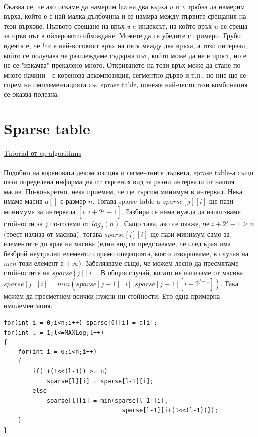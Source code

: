 \documentclass[12pt]{article}
\begin{document}
\paragraph*{}
Оказва се, че ако искаме да намерим lca на два върха $u$ и $v$ трябва да намерим върха, който е с най-малка дълбочина и се намира между първите срещания на тези върхове. Първото срещане на връх $u$  e индексът, на който връх $u$ се среща за пръв път в ойлеровото обхождане. Можете да се убедите с примери. Грубо идеята е, че $lca$ е най-високият връх на пътя между два връха, а този интервал, който се получава че разглеждаме съдържа път, който може да не е прост, но е не се "изкачва"  прекалено много. Откриването на този връх може да стане по много начини - с коренова декомпозиция, сегментно дърво и т.н., но ние ще се спрем на имплементацията със sprase table, понеже най-често тази комбинация се оказва полезна.

\section*{Sparse table}
\paragraph*{}
\href{https://cp-algorithms.com/data_structures/sparse-table.html}{Tutorial от cp-algorithms}
\paragraph*{}
Подобно на кореновата декомпозиция и сегментните дървета, sprase table-а също пази определена информация от търсения вид за разни интервали от нашия масив. По-конкретно, нека приемем, че ще търсим минимум в интервал. Нека имаме масив $a[]$ с размер $n$. Тогава sparse table-a $sparse[j][i]$ ще пази минимума за интервала $[i, i+2^j-1]$. Разбира се няма нужда да използваме стойности за $j$ по-големи от $log_2(n)$. Също така, ако се окаже, че $i+2^j-1 \geq n$ (тоест излиза от масива), тогава $sparse[j][i]$ ще пази минимум само за елементите до края на масива (един вид си представяме, че след края има безброй неутрални елементи спрямо операцията, която извършваме, в случая на $min$ този елемент е $+\infty$). Забелязваме също, че можем лесно да пресмятаме стойностите на $sparse[j][i]$. В общия случай, когато не излизаме от масива $sparse[j][i] = min(sparse[j-1][i], sparse[j-1][i+2^{j-1}])$. Така можем да пресметнем всички нужни ни стойности. Ето една примерна имплементация. 
\begin{lstlisting}
for(int i = 0;i<n;i++) sparse[0][i] = a[i];
for(int l = 1;l<=MAXLog;l++)
{
	for(int i = 0;i<n;i++)
	{
		if(i+(1<<(l-1)) >= n)
			sparse[l][i] = sparse[l-1][i];
		else
			sparse[l][i] = min(sparse[l-1][i], 
			                     sparse[l-1][i+(1<<(l-1))]);
	}
}
\end{lstlisting}
\end{document}

